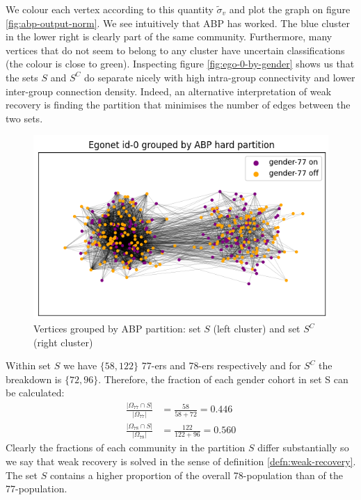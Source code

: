 \documentclass[]{article}
\newcommand{\figwidth}{0.8\linewidth}
\begin{document}
\begin{multicols*}{2}
We colour each vertex according to this quantity $\tilde{\sigma}_v$ and plot the graph on figure \ref{fig:abp-output-norm}. We see intuitively that ABP has worked. The blue cluster in the lower right is clearly part of the same community. Furthermore, many vertices that do not seem to belong to any cluster have uncertain classifications (the colour is close to green). Inspecting figure \ref{fig:ego-0-by-gender} shows us that the sets $S$ and $S^C$ do separate nicely with high intra-group connectivity and lower inter-group connection density. Indeed, an alternative interpretation of weak recovery is finding the partition that minimises the number of edges between the two sets.
%
\begin{figure}[H]
	\centering
	\includegraphics[width=\figwidth]{ego-0-abp-by-gender.png}
	\caption{Vertices grouped by ABP partition: set $S$ (left cluster) and set $S^C$ (right cluster)}
	\label{fig:abp-output-by-gender}
\end{figure}

Within set $S$ we have $\{58, 122\}$ 77-ers and 78-ers respectively and for $S^C$ the breakdown is $\{72, 96\}$. Therefore, the fraction of each gender cohort in set S can be calculated:
%
\begin{equation}
	\begin{aligned}
	\frac{|\Omega_{77} \cap S|}{|\Omega_{77}|} &= \frac{58}{58+72} = 0.446 \\
	\frac{|\Omega_{78} \cap S|}{|\Omega_{78}|} &= \frac{122}{122+96} = 0.560
	\end{aligned}
\end{equation}
%
Clearly the fractions of each community in the partition $S$ differ substantially so we say that weak recovery is solved in the sense of definition \ref{defn:weak-recovery}. The set $S$ contains a higher proportion of the overall 78-population than of the 77-population.


\end{multicols*}
\end{document}
